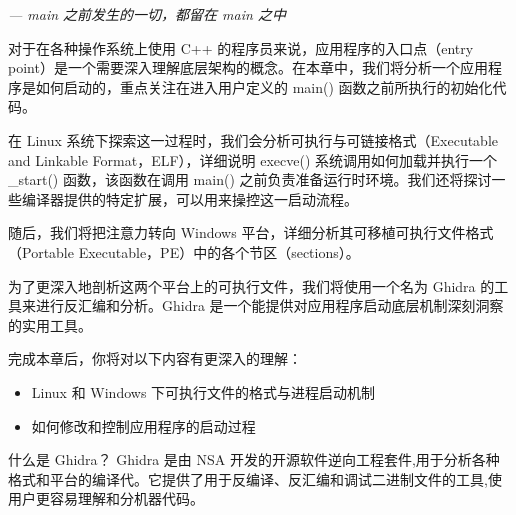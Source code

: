 
\begin{flushright}
\textit{--- main 之前发生的一切，都留在 main 之中}
\end{flushright}

对于在各种操作系统上使用 C++ 的程序员来说，应用程序的入口点（entry point）是一个需要深入理解底层架构的概念。在本章中，我们将分析一个应用程序是如何启动的，重点关注在进入用户定义的 main() 函数之前所执行的初始化代码。

在 Linux 系统下探索这一过程时，我们会分析可执行与可链接格式（Executable and Linkable Format，ELF），详细说明 execve() 系统调用如何加载并执行一个 \_start() 函数，该函数在调用 main() 之前负责准备运行时环境。我们还将探讨一些编译器提供的特定扩展，可以用来操控这一启动流程。

随后，我们将把注意力转向 Windows 平台，详细分析其可移植可执行文件格式（Portable Executable，PE）中的各个节区（sections）。

为了更深入地剖析这两个平台上的可执行文件，我们将使用一个名为 Ghidra 的工具来进行反汇编和分析。Ghidra 是一个能提供对应用程序启动底层机制深刻洞察的实用工具。

完成本章后，你将对以下内容有更深入的理解：

\begin{itemize}
\item 
Linux 和 Windows 下可执行文件的格式与进程启动机制

\item 
如何修改和控制应用程序的启动过程
\end{itemize}

\begin{myTip}{什么是 Ghidra？}
Ghidra 是由 NSA 开发的开源软件逆向工程套件,用于分析各种格式和平台的编译代。它提供了用于反编译、反汇编和调试二进制文件的工具,使用户更容易理解和分机器代码。
\end{myTip}





